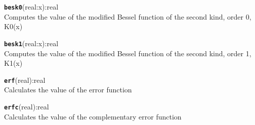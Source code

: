 \hrulefill

\texttt{{\large\textbf{besk0}}}\textsf{(real:x):real}\\
 Computes the value of the modified Bessel function of the second kind, order 0, K0(x)

\hrulefill

\texttt{{\large\textbf{besk1}}}\textsf{(real:x):real}\\
 Computes the value of the modified Bessel function of the second kind, order 1, K1(x)

\hrulefill

\texttt{{\large\textbf{erf}}}\textsf{(real):real}\\
 Calculates the value of the error function

\hrulefill

\texttt{{\large\textbf{erfc}}}\textsf{(real):real}\\
 Calculates the value of the complementary error function
